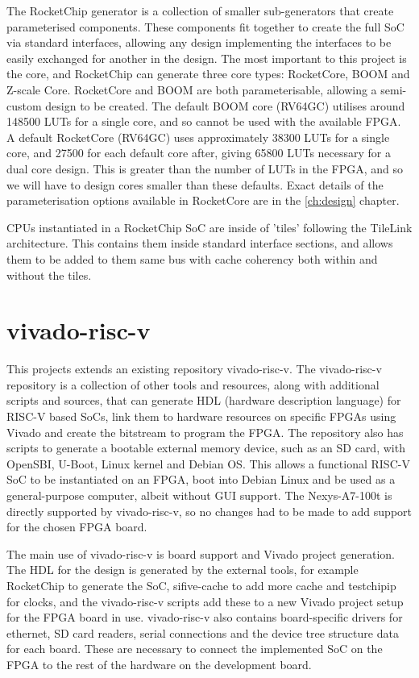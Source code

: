 The RocketChip generator is a collection of smaller sub-generators that create parameterised components. These components fit together to create the full SoC via standard interfaces, allowing any design implementing the interfaces to be easily exchanged for another in the design. The most important to this project is the core, and RocketChip can generate three core types: RocketCore, BOOM and Z-scale Core. RocketCore and BOOM are both parameterisable, allowing a semi-custom design to be created. The default BOOM core (RV64GC) utilises around 148500 LUTs for a single core, and so cannot be used with the available FPGA. A default RocketCore (RV64GC) uses approximately 38300 LUTs for a single core, and 27500 for each default core after, giving 65800 LUTs necessary for a dual core design. This is greater than the number of LUTs in the FPGA, and so we will have to design cores smaller than these defaults. Exact details of the parameterisation options available in RocketCore are in the \ref{ch:design} chapter.

CPUs instantiated in a RocketChip SoC are inside of 'tiles' following the TileLink architecture. This contains them inside standard interface sections, and allows them to be added to them same bus with cache coherency both within and without the tiles. %

\section{vivado-risc-v}
\label{vivado-risc-v}
This projects extends an existing repository vivado-risc-v\cite{vivado-risc-v}. The vivado-risc-v repository is a collection of other tools and resources, along with additional scripts and sources, that can generate HDL (hardware description language) for RISC-V based SoCs, link them to hardware resources on specific FPGAs using Vivado and create the bitstream to program the FPGA. The repository also has scripts to generate a bootable external memory device, such as an SD card, with OpenSBI, U-Boot, Linux kernel and Debian OS. This allows a functional RISC-V SoC to be instantiated on an FPGA, boot into Debian Linux and be used as a general-purpose computer, albeit without GUI support. The Nexys-A7-100t is directly supported by vivado-risc-v, so no changes had to be made to add support for the chosen FPGA board.

The main use of vivado-risc-v is board support and Vivado project generation. The HDL for the design is generated by the external tools, for example RocketChip to generate the SoC, sifive-cache to add more cache and testchipip for clocks, and the vivado-risc-v scripts add these to a new Vivado project setup for the FPGA board in use. vivado-risc-v also contains board-specific drivers for ethernet, SD card readers, serial connections and the device tree structure data for each board. These are necessary to connect the implemented SoC on the FPGA to the rest of the hardware on the development board.

